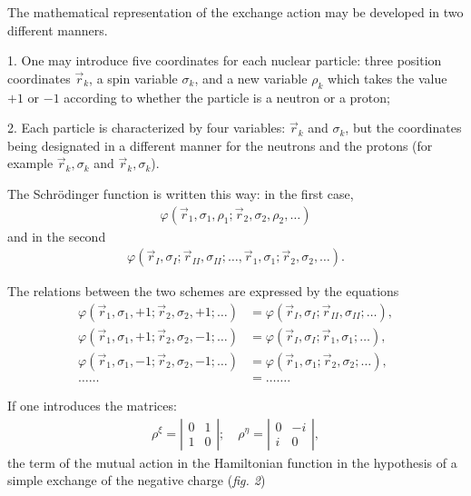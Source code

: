 \documentclass[a4paper,11pt]{article}
\newcommand{\?}[2]{#1\footnote{\textsc{Translator note}: #2}}
\newcommand{\nequ}[2]{\begin{align*}\tag{#1}#2\end{align*}}
\newcommand{\uequ}[1]{\begin{align*}#1\end{align*}}
\begin{document}
{{The mathematical representation of the exchange action may be developed in two different manners.

1. One may introduce five coordinates for each nuclear particle: three position coordinates $\vec{r}_k$, a spin variable $\sigma_k$, and a new variable $\rho_k$ which takes the value $+1$ or $-1$ according to whether the particle is a neutron or a proton;

2. Each particle is characterized by four variables: $\vec{r}_k$ and $\sigma_k$, but the coordinates being designated in a different manner for the neutrons and the protons (for example $\vec{r}_k, \sigma_k$ and $\vec{r}_k, \sigma_k$).

The Schr\"odinger function is written this way: in the first case,
\uequ{
\varphi\left(\vec{r}_1, \sigma_1, \rho_1; \vec{r}_2, \sigma_2, \rho_2, \dots\right)
}
and in the second
\uequ{
\varphi\left(\vec{r}_I, \sigma_I; \vec{r}_{II}, \sigma_{II}; \dots,  \vec{r}_1, \sigma_1; \vec{r}_2, \sigma_2, \dots\right).}

The relations between the two schemes are expressed by the equations
\nequ{9}{
\varphi\left(\vec{r}_1, \sigma_1, +1; \vec{r}_2, \sigma_2, +1; \dots \right) &= \varphi\left(\vec{r}_I, \sigma_I; \vec{r}_{II}, \sigma_{II}; \dots\right),\\
\varphi\left(\vec{r}_1, \sigma_1, +1; \vec{r}_2, \sigma_2, -1; \dots \right) &= \varphi\left(\vec{r}_I, \sigma_I; \vec{r}_{1}, \sigma_{1}; \dots\right),\\
\varphi\left(\vec{r}_1, \sigma_1, -1; \vec{r}_2, \sigma_2, -1; \dots \right) &= \varphi\left(\vec{r}_1, \sigma_1; \vec{r}_{2}, \sigma_{2}; \dots\right),\\
\dots\dots &= \dots\dots.
}

If one introduces the matrices:
\uequ{
\rho^\xi = \left|\begin{matrix}
	0 & 1 \\
	1 & 0 
\end{matrix}\right|;\quad
\rho^\eta = \left|\begin{matrix}
	0 & -i \\
	i & 0 
\end{matrix}\right|,
}
the term of the mutual action in the Hamiltonian function in the hypothesis of a simple exchange of the negative charge (\textit{fig. 2})

}}
\end{document}
